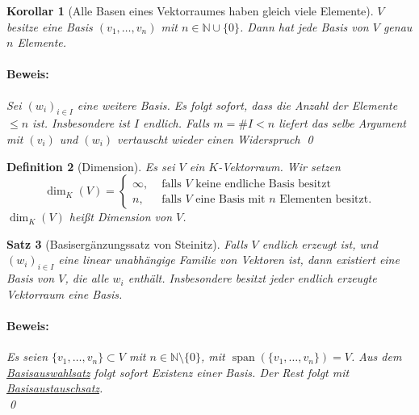 \documentclass{report}
\newcommand{\IN}[1]{\index{#1|BH}}
\newcommand{\N}{\mathbb{N}}
\DeclareMathOperator{\Span}{span}
\theoremstyle{customrem}
\theoremstyle{customdef}
\newtheorem{definition}{Definition}[chapter]
\newtheorem{korrolar}[definition]{Korollar}
\newtheorem{satz}[definition]{Satz}
\renewenvironment{proof}{\paragraph{Beweis: }}{\qed}
\theoremstyle{customenv}
\begin{document}
	\begin{korrolar}[Alle Basen eines Vektorraumes haben gleich viele Elemente]
		\(V\) besitze eine Basis \((v_1, \dots, v_n)\) mit \(n \in \N \cup \{0\}\). Dann hat jede Basis von \(V\) genau \(n\) Elemente.

		\begin{proof}
			Sei \((w_i)_{i \in I}\) eine weitere Basis. Es folgt sofort, dass die Anzahl der Elemente \(\le n\) ist. Insbesondere ist \(I\) endlich. Falls \(m = \#I < n\) liefert das selbe Argument mit \((v_i)\) und \((w_i)\) vertauscht wieder einen Widerspruch \Lightning
		\end{proof}
	\end{korrolar}
	\vspace{.25cm}
	\begin{definition}[Dimension]
		\IN{Dimension}
		Es sei \(V\) ein \(K\)-Vektorraum. Wir setzen
		\[\dim_K(V) = \begin{cases}\infty,&\text{ falls \(V\) keine endliche Basis besitzt}\\n,&\text{ falls \(V\) eine Basis mit \(n\) Elementen besitzt.}\end{cases}\]
		\(\dim_K(V)\) heißt Dimension von \(V\).
	\end{definition}

	\begin{satz}[Basisergänzungssatz von Steinitz]
		\label{satz218}
		Falls \(V\) endlich erzeugt ist, und \((w_i)_{i \in I}\) eine linear unabhängige Familie von Vektoren ist, dann existiert eine Basis von \(V\), die alle \(w_i\) enthält. Insbesondere besitzt jeder endlich erzeugte Vektorraum eine Basis.\\

		\begin{proof}
			Es seien \(\{v_1, \dots, v_n\} \subset V\) mit \(n \in \N \setminus\{0\}\), mit \(\Span(\{v_1, \dots, v_n\}) = V\). Aus dem \hyperref[satz213]{Basisauswahlsatz} folgt sofort Existenz einer Basis. Der Rest folgt mit \hyperref[satz215]{Basisaustauschsatz}.\\
		\end{proof}
	\end{satz}
\end{document}
